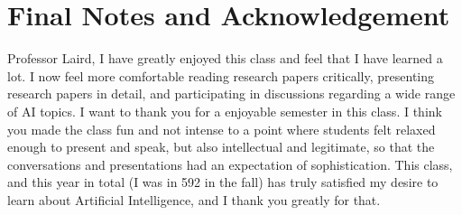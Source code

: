 \documentclass{article}
\begin{document}
\section{Final Notes and Acknowledgement}

Professor Laird, I have greatly enjoyed this class and feel that I have learned a lot. I now feel more comfortable  reading research papers critically, presenting research papers in detail, and participating in discussions regarding a wide range of AI topics. I want to thank you for a enjoyable semester in this class. I think you made the class fun and not intense to a point where students felt relaxed enough to present and speak, but also intellectual and legitimate, so that the conversations and presentations had an expectation of sophistication. This class, and this year in total (I was in 592 in the fall) has truly satisfied my desire to learn about Artificial Intelligence, and I thank you greatly for that.
\end{document}
